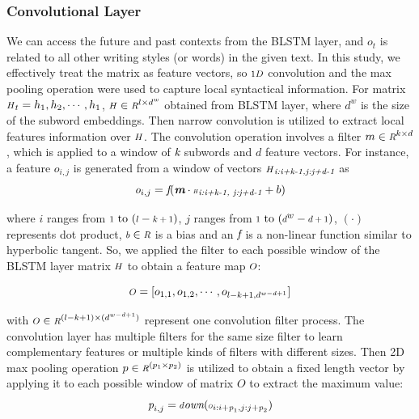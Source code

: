 \documentclass[conference]{IEEEtran}
\newcommand*{\Scale}[2][4]{\scalebox{#1}{$#2$}}%
\begin{document}
\subsubsection{Convolutional Layer}
We can access the future and past contexts from the BLSTM layer, and $o_t$ is related to all other writing styles (or words) in the given text. In this study, we effectively treat the matrix as feature vectors, so $\Scale[0.8]1\Scale[0.8]D$ convolution and the max pooling operation were used to capture local syntactical information. For matrix $\Scale[0.8]H_t=h_1,h_2,\cdots,h_1$, $\Scale[0.8]H\in\mathbb{\Scale[0.8]R}^{l\times d^{w}}$ obtained from BLSTM layer, 
where $d^{w}$ is the size of the subword embeddings. Then narrow convolution is utilized to extract local  features information over $\Scale[0.8]H$. The convolution operation involves a filter $m\in\mathbb{\Scale[0.8]R}^{k\times d}$, which is applied to a window of $\emph{k}$ subwords and $d$ feature vectors. For instance, a feature $o_{i,j}$ is generated from a window of vectors $\Scale[0.8]H_\emph{i:i+k-1,j:j+d-1}$ as
\setlength{\arraycolsep}{-1pt}
\begin{equation}\label{eqn7}
     \emph{o}_{i,j}= \emph{f}(\emph{\textbf{m}}\cdot\emph{\Scale[0.5]H}_\emph{i:i+k-1,~j:j+d-1}+b )
\end{equation}

where $i$ ranges from $\Scale[0.8]1~\text{to}~{(\Scale[0.8]l-\Scale[0.8]{k+1})}$, $j$ ranges from $\Scale[0.8]1~\text{to}~(\Scale[0.8]d^{\Scale[0.8]{w}}-\Scale[0.8]{d+1})$, $(\cdot)$ represents dot product, $\Scale[0.8]b\in\mathbb{\Scale[0.8]R}$ is a bias and an $\emph{f}$ is a non-linear function similar to hyperbolic tangent. So, we applied the filter to each possible window of the BLSTM layer matrix $\emph{\Scale[0.8]H}$ to obtain a feature map $\mathbf{\Scale[0.8]O}$:

\setlength{\arraycolsep}{-1pt}
\begin{equation}\label{eqn8}
     \textit{\Scale[0.8]O}=[o_{1,1},o_{1,2},\cdots,o_{l-k+1,d^{w-d+1}}]
\end{equation}
\setlength{\arraycolsep}{0pt}

with $\textit{\Scale[0.8]O}\in\mathbb{\Scale[0.8]R}^{(l-k+1)\times(d^{w-d+1})}$ represent one convolution filter process. The convolution layer has multiple filters for the same size filter to learn complementary features or multiple kinds of filters with different sizes. Then 2D max pooling operation $p\in\mathbb{\Scale[0.8]R}^{(p_1\times p_2)}$ is utilized to obtain a fixed length vector by applying it to each possible window of matrix $\textit{O}$ to extract the maximum value:
\setlength{\arraycolsep}{-3pt}
\begin{equation}\label{eqn9} 
\textit{p}_{i,j}=\textit{\Scale[0.8]down}(\textit{\Scale[0.5]O}_{i:i+\textit{p}_{1},j:j+\textit{p}_{2}})
\end{equation}
\end{document}
